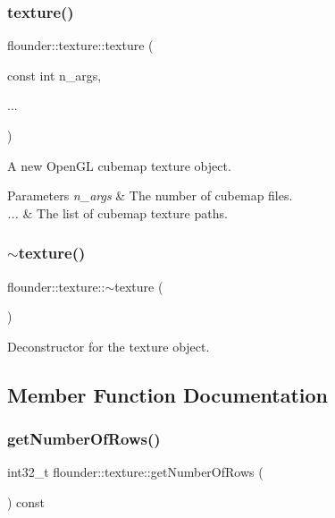 \subsubsection{\texorpdfstring{texture()}{texture()}\hspace{0.1cm}{\footnotesize\ttfamily [2/2]}}
{\footnotesize\ttfamily flounder\+::texture\+::texture (\begin{DoxyParamCaption}\item[{const int}]{n\+\_\+args,  }\item[{}]{... }\end{DoxyParamCaption})}



A new Open\+GL cubemap texture object. 


\begin{DoxyParams}{Parameters}
{\em n\+\_\+args} & The number of cubemap files. \\
\hline
{\em ...} & The list of cubemap texture paths. \\
\hline
\end{DoxyParams}
\mbox{\label{classflounder_1_1texture_a8271c7f9860a5a235be9b1207bed2c39}} 
\subsubsection{\texorpdfstring{$\sim$texture()}{~texture()}}
{\footnotesize\ttfamily flounder\+::texture\+::$\sim$texture (\begin{DoxyParamCaption}{ }\end{DoxyParamCaption})}



Deconstructor for the texture object. 



\subsection{Member Function Documentation}
\mbox{\label{classflounder_1_1texture_a299af5830ad52b5759014e363805e49b}} 
\subsubsection{\texorpdfstring{get\+Number\+Of\+Rows()}{getNumberOfRows()}}
{\footnotesize\ttfamily int32\+\_\+t flounder\+::texture\+::get\+Number\+Of\+Rows (\begin{DoxyParamCaption}{ }\end{DoxyParamCaption}) const\hspace{0.3cm}{\ttfamily [inline]}}



